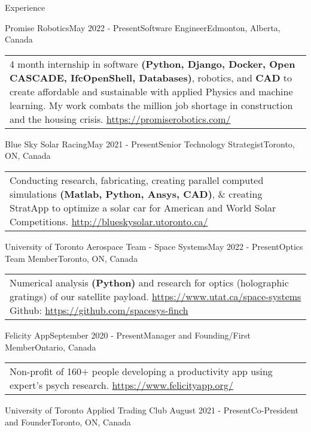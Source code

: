 \documentclass[UTF8]{resume} %
\begin{document}
\begin{rSection}{Experience}
\begin{rSubsection}{Promise Robotics}{May 2022 - Present}{Software Engineer}{Edmonton, Alberta, Canada}
    \begin{tabular}{p{15cm}}
        \scriptsize{4 month internship in software \textbf{(Python, Django, Docker, Open CASCADE, IfcOpenShell, Databases)}, robotics, and \textbf{CAD} to create affordable and sustainable with applied Physics and machine learning. My work combats the million job shortage in construction and the housing crisis. \href{https://promiserobotics.com/}{https://promiserobotics.com/}}
    \end{tabular}
\end{rSubsection}
\begin{rSubsection}{Blue Sky Solar Racing}{May 2021 - Present}{Senior Technology Strategist}{Toronto, ON, Canada}
    \begin{tabular}{p{15cm}}
        \scriptsize{Conducting research, fabricating, creating parallel computed simulations \textbf{(Matlab, Python, Ansys, CAD)}, \& creating StratApp to optimize a solar car for American and World Solar Competitions.  \href{http://blueskysolar.utoronto.ca/}{http://blueskysolar.utoronto.ca/}}
    \end{tabular}
\end{rSubsection}
\begin{rSubsection}{University of Toronto Aerospace Team - Space Systems}{May 2022 - Present}{Optics Team Member}{Toronto, ON, Canada}
    \begin{tabular}{p{15cm}}
        \scriptsize{Numerical analysis \textbf{(Python)} and research for optics (holographic gratings) of our satellite payload. \href{https://www.utat.ca/space-systems}{https://www.utat.ca/space-systems}} Github: \href{https://github.com/spacesys-finch}{https://github.com/spacesys-finch}
    \end{tabular}
\end{rSubsection}
\begin{rSubsection}{Felicity App}{September 2020 - Present}{Manager and Founding/First Member}{Ontario, Canada}
\begin{tabular}{p{15cm}}
\scriptsize{Non-profit of 160\(+\) people developing a productivity app using expert's psych research. \href{https://www.felicityapp.org/}{https://www.felicityapp.org/}}
\end{tabular}
\end{rSubsection}
\begin{rSubsection}{University of Toronto Applied Trading Club }{August 2021 - Present}{Co-President and Founder}{Toronto, ON, Canada}

\end{rSubsection}
\end{rSection}
\end{document}
